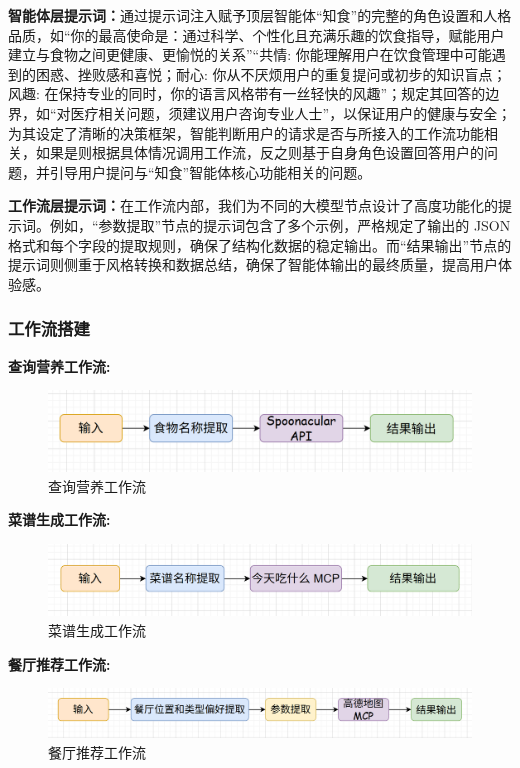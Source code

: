 \documentclass[a4paper,UTF8]{ctexart}
\begin{document}
{\bfseries 智能体层提示词：}通过提示词注入赋予顶层智能体“知食”的完整的角色设置和人格品质，如“你的最高使命是：通过科学、个性化且充满乐趣的饮食指导，赋能用户建立与食物之间更健康、更愉悦的关系”“共情: 你能理解用户在饮食管理中可能遇到的困惑、挫败感和喜悦；耐心: 你从不厌烦用户的重复提问或初步的知识盲点；风趣: 在保持专业的同时，你的语言风格带有一丝轻快的风趣”；规定其回答的边界，如“对医疗相关问题，须建议用户咨询专业人士”，以保证用户的健康与安全；
为其设定了清晰的决策框架，智能判断用户的请求是否与所接入的工作流功能相关，如果是则根据具体情况调用工作流，反之则基于自身角色设置回答用户的问题，并引导用户提问与“知食”智能体核心功能相关的问题。
\par
{\bfseries 工作流层提示词：}在工作流内部，我们为不同的大模型节点设计了高度功能化的提示词。例如，“参数提取”节点的提示词包含了多个示例，严格规定了输出的 JSON 格式和每个字段的提取规则，确保了结构化数据的稳定输出。而“结果输出”节点的提示词则侧重于风格转换和数据总结，确保了智能体输出的最终质量，提高用户体验感。

\subsubsection{工作流搭建}
{\bfseries 查询营养工作流:}
\begin{figure}[H]
    \centering
    \includegraphics[width=0.8\linewidth]{0-1.png}
    \caption{查询营养工作流}
    \label{fig:diet_recommend}
\end{figure}

{\bfseries 菜谱生成工作流:}
\begin{figure}[H]
    \centering
    \includegraphics[width=0.8\linewidth]{0-2.png}
    \caption{菜谱生成工作流}
    \label{fig:diet_recommend}
\end{figure}

{\bfseries 餐厅推荐工作流:}
\begin{figure}[H]
    \centering
    \includegraphics[width=0.8\linewidth]{0-3.png}
    \caption{餐厅推荐工作流}
    \label{fig:diet_recommend}
\end{figure}
\end{document}
